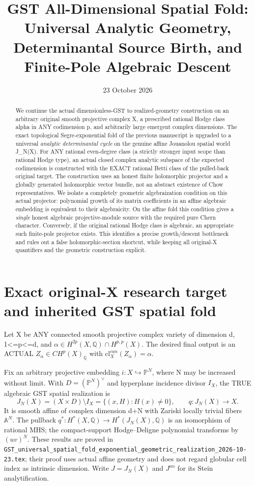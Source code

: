 \documentclass[11pt]{article}
\title{GST All-Dimensional Spatial Fold: Universal Analytic Geometry, Determinantal Source Birth, and Finite-Pole Algebraic Descent}
\date{23 October 2026}
\begin{document}
\maketitle
\begin{abstract}
We continue the actual dimensionless-GST to realized-geometry
construction on an arbitrary original smooth projective complex X,
a prescribed rational Hodge class alpha in ANY codimension p, and
arbitrarily large emergent complex dimensions.
The exact topological Segre-exponential fold of the previous
manuscript is upgraded to a universal \emph{analytic determinantal
cycle} on the genuine affine Jouanolou spatial world J_N(X).
For ANY rational even-degree class (a strictly stronger input scope
than rational Hodge type), an actual closed complex analytic
subspace of the expected codimension is constructed with
the EXACT rational Betti class of the pulled-back original target.
The construction uses an honest finite holomorphic projector
and a globally generated holomorphic vector bundle, not an
abstract existence of Chow representatives. We isolate a
completely geometric algebraization condition on this actual
projector: polynomial growth of its matrix coefficients in an
affine algebraic embedding is equivalent to their algebraicity.
On the affine fold this condition gives a \emph{single} honest
algebraic projective-module source with the required pure Chern
character. Conversely, if the original rational Hodge class is
algebraic, an appropriate such finite-pole projector exists.
This identifies a precise growth/descent bottleneck and
rules out a false holomorphic-section shortcut, while keeping
all original-X quantifiers and the geometric construction explicit.
\end{abstract}

\section{Exact original-X research target and inherited GST spatial fold}
Let X be ANY connected smooth projective complex variety of
dimension d, 1<=p<=d, and
$\alpha\in H^{2p}(X,\mathbb Q)\cap H^{p,p}(X)$.
The desired final output is an ACTUAL
$Z_\alpha\in CH^p(X)_{\mathbb Q}$ with
$\mathrm{cl}^{can}_X(Z_\alpha)=\alpha$.

Fix an arbitrary projective embedding $i:X\hookrightarrow
\mathbb P^N$, where N may be increased without limit.
With $D=(\mathbb P^N)^\vee$ and hyperplane incidence
divisor $I_X$, the TRUE algebraic GST spatial realization is
\[
 \boxed{J_N(X)=(X\times D)\setminus I_X
    =\{(x,H):H(x)\ne0\},\qquad q:J_N(X)\to X.}       \tag{1.1}
\]
It is smooth affine of complex dimension d+N
with Zariski locally trivial fibers $\mathbb A^N$.
The pullback $q^*:H^*(X,\mathbb Q)\to
H^*(J_N(X),\mathbb Q)$ is an isomorphism of
rational MHS; the compact-support Hodge--Deligne
polynomial transforms by $(uv)^N$.
These results are proved in
\texttt{GST\_universal\_spatial\_fold\_exponential\_geometric\_realization\_2026-10-23.tex};
their proof uses actual affine geometry and
does not regard globular cell index as intrinsic dimension.
Write $J=J_N(X)$ and $J^{an}$ for its Stein analytification.
\end{document}
